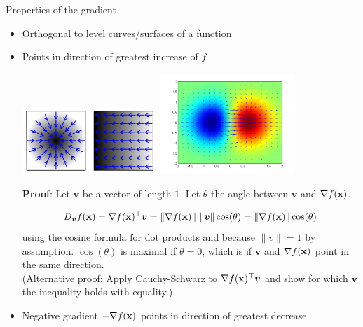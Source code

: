 \documentclass[11pt,compress,t,notes=noshow, xcolor=table]{beamer}
\begin{document}
\begin{vbframe}{Properties of the gradient}

\begin{itemize}
	\item Orthogonal to level curves/surfaces of a function
	\item Points in direction of greatest increase of $f$
	\begin{center}
		\includegraphics[width = 0.4\textwidth]{figure_man/gradient3.png} \includegraphics[width = 0.4\textwidth]{figure_man/gradient.png}
	\end{center}
	\begin{footnotesize}
	\textbf{Proof}: Let $\bm{v}$ be a vector of length $1$. Let $\theta$ the angle between $\bm{v}$ and $\nabla f(\mathbf{x})$. 
 
	$$
		D_{\bm{v}}f(\mathbf{x}) = \nabla f(\mathbf{x})^\top \bm{v} = \|\nabla f(\mathbf{x})\|~\|\bm{v}\|\cos(\theta) = \|\nabla f(\mathbf{x})\| \cos(\theta)
	$$
	using the cosine formula for dot products and because $\|v\| = 1$ by assumption. $\cos(\theta)$ is maximal if $\theta = 0$, which is if $\bm{v}$ and $\nabla f(\mathbf{x})$ point in the same direction. \\
	(Alternative proof: Apply Cauchy-Schwarz to $\nabla f(\mathbf{x})^\top \bm{v}$ and show for which $\bm{v}$ the inequality holds with equality.)  
	\end{footnotesize}
\end{itemize}


\framebreak

\begin{itemize}
	\item Negative gradient $- \nabla f(\mathbf{x})$ points in direction of greatest decrease
\end{itemize}


\end{vbframe}
\end{document}
